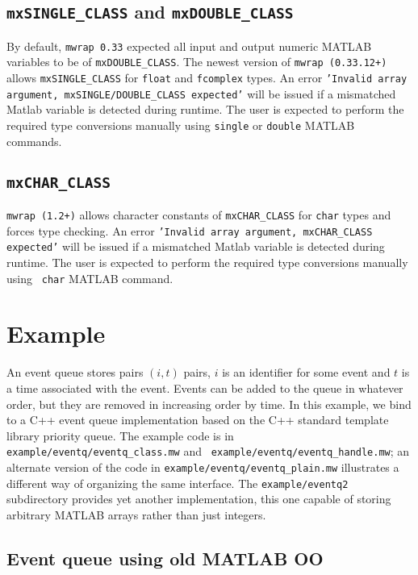 \documentclass[12pt]{article}
\begin{document}
\subsection{{\tt mxSINGLE\_CLASS} and {\tt mxDOUBLE\_CLASS}}

By default, {\tt mwrap 0.33} expected all input and output numeric
MATLAB variables to be of {\tt mxDOUBLE\_CLASS}. The newest version of
{\tt mwrap (0.33.12+)} allows {\tt mxSINGLE\_CLASS} for {\tt float}
and {\tt fcomplex} types. An error {\tt 'Invalid array argument,
  mxSINGLE/DOUBLE\_CLASS expected'} will be issued if a mismatched
Matlab variable is detected during runtime. The user is expected to
perform the required type conversions manually using {\tt single} or
{\tt double} MATLAB commands.

\subsection{{\tt mxCHAR\_CLASS}}

{\tt mwrap (1.2+)} allows character constants of {\tt mxCHAR\_CLASS}
for {\tt char} types and forces type checking. An error {\tt 'Invalid
  array argument, mxCHAR\_CLASS expected'} will be issued if a
mismatched Matlab variable is detected during runtime. The user is
expected to perform the required type conversions manually using {\tt
  char} MATLAB command.


\section{Example}

An event queue stores pairs $(i, t)$ pairs, $i$ is an identifier for
some event and $t$ is a time associated with the event.  Events can be
added to the queue in whatever order, but they are removed in
increasing order by time.  In this example, we bind to a C++ event
queue implementation based on the C++ standard template library
priority queue.  The example code is in {\tt
  example/eventq/eventq\_class.mw} and {\tt
  example/eventq/eventq\_handle.mw}; an alternate version of the code
in {\tt example/eventq/eventq\_plain.mw} illustrates a different way
of organizing the same interface.  The {\tt example/eventq2}
subdirectory provides yet another implementation, this one capable of
storing arbitrary MATLAB arrays rather than just integers.

\subsection{Event queue using old MATLAB OO}
\end{document}
